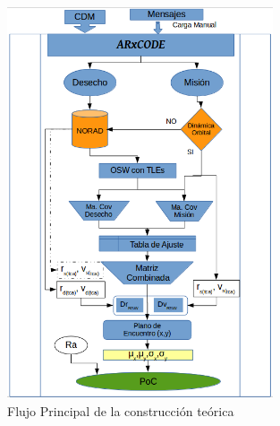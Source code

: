 \begin{figure}[!h]
 \centering
 \includegraphics[width=0.7\textwidth]{imagenes/flujomain}
 \caption{Flujo Principal de la construcci\'on te\'orica}
\end{figure}


% 


